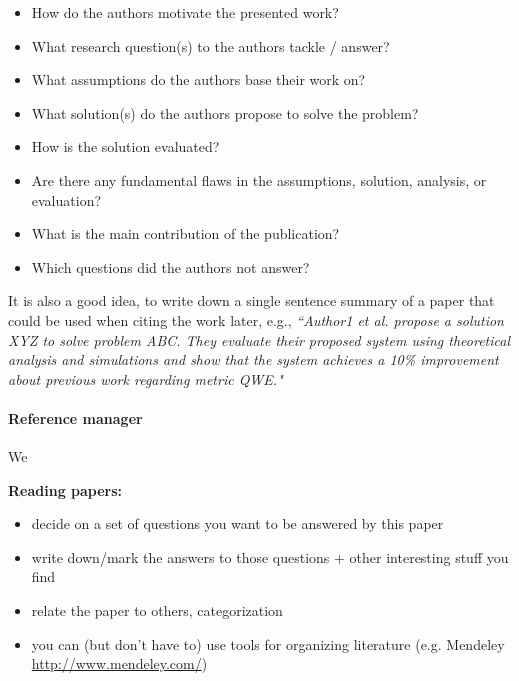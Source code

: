 \documentclass{article}
\begin{document}
\begin{itemize}
	\item How do the authors motivate the presented work?
	\item What research question(s) to the authors tackle / answer?
	\item What assumptions do the authors base their work on?
	\item What solution(s) do the authors propose to solve the problem?
	\item How is the solution evaluated?
	\item Are there any fundamental flaws in the assumptions, solution, analysis, or evaluation?
	\item What is the main contribution of the publication?
	\item Which questions did the authors not answer?
\end{itemize}

It is also a good idea, to write down a single sentence summary of a paper that could be used when citing the work later, e.g., \emph{``Author1 et al. propose a solution XYZ to solve problem ABC. They evaluate their proposed system using theoretical analysis and simulations and show that the system achieves a 10\% improvement about previous work regarding metric QWE."}


\paragraph{Reference manager}

We 


\textbf{Reading papers: }
\begin{itemize}
\item decide on a set of questions you want to be answered by this paper
\item write down/mark the answers to those questions + other interesting stuff you find
\item relate the paper to others, categorization 
\item you can (but don't have to) use tools for organizing literature (e.g. Mendeley \url{http://www.mendeley.com/}) 
\end{itemize}
\end{document}
